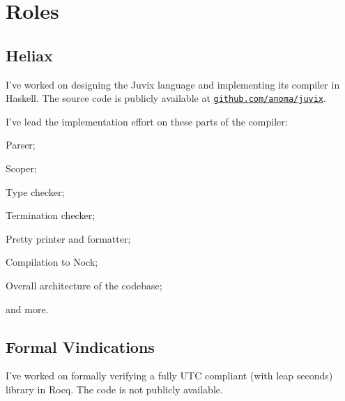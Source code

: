 \documentclass[11pt]{article}
\begin{document}
\section{Roles}
\subsection{Heliax\label{role:heliax}}
I've worked on designing the Juvix language and implementing its compiler in Haskell.
The source code is publicly available at \href{https://github.com/anoma/juvix}{\texttt{github.com/anoma/juvix}}.

I've lead the implementation effort on these parts of the compiler:
\begin{enumerate*}
  \item Parser;
  \item Scoper;
  \item Type checker;
  \item Termination checker;
  \item Pretty printer and formatter;
  \item Compilation to Nock;
  \item Overall architecture of the codebase;
\end{enumerate*}
and more.

\subsection{Formal Vindications}\label{role:fv}
I've worked on formally verifying a fully UTC compliant (with leap seconds)
library in Rocq. The code is not publicly available.
\end{document}
